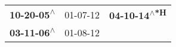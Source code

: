 \begin{supertabular}{lll}
 \textbf{10-20-05\textsuperscript{$\wedge$}} &  01-07-12\textsuperscript{} &  \textbf{04-10-14\textsuperscript{$\wedge$*H}} \\
 \textbf{03-11-06\textsuperscript{$\wedge$}} &  01-08-12\textsuperscript{} &                                                \\
\end{supertabular}
